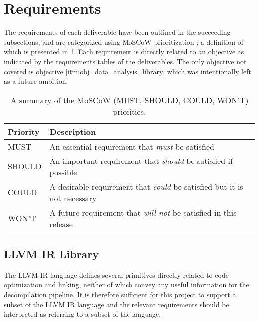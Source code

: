 
\section{Requirements}

The requirements of each deliverable have been outlined in the succeeding subsections, and are categorized using MoSCoW prioritization \cite{MoSCoW_analysis}; a definition of which is presented in \cref{tbl:MoSCoW_priorities}. Each requirement is directly related to an objective as indicated by the requirements tables of the deliverables. The only objective not covered is objective \ref{itm:obj_data_analysis_library} which was intentionally left as a future ambition.

\begin{table}[htbp]
	\begin{center}
		\begin{tabular}{|l|l|}
			\hline
			Priority & Description \\
			\hline
			MUST & An essential requirement that \textit{must} be satisfied \\
			SHOULD & An important requirement that \textit{should} be satisfied if possible \\
			COULD & A desirable requirement that \textit{could} be satisfied but it is not necessary \\
			WON'T & A future requirement that \textit{will not} be satisfied in this release \\
			\hline
		\end{tabular}
	\end{center}
	\caption{A summary of the MoSCoW (MUST, SHOULD, COULD, WON'T) priorities.}
	\label{tbl:MoSCoW_priorities}
\end{table}


\subsection{LLVM IR Library}

The LLVM IR language defines several primitives directly related to code optimization and linking, neither of which convey any useful information for the decompilation pipeline. It is therefore sufficient for this project to support a subset of the LLVM IR language and the relevant requirements should be interpreted as referring to a subset of the language.

